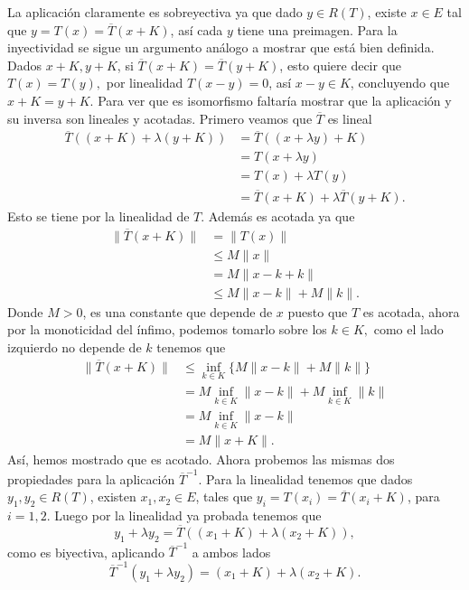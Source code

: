 \begin{itemize}
\begin{sproof}
        La aplicación claramente es sobreyectiva ya que dado $y\in R(T)$, existe $x\in E$ tal que $y=T(x)=\overline{T}(x+K)$, así cada $y$ tiene una preimagen. Para la inyectividad se sigue un argumento análogo a mostrar que está bien definida. Dados $x+K,y+K$, si $\overline{T}(x+K)=\overline{T}(y+K)$, esto quiere decir que $T(x)=T(y),$ por linealidad $T(x-y)=0$, así $x-y\in K$, concluyendo que $x+K=y+K.$ Para ver que es isomorfismo faltaría mostrar que la aplicación y su inversa son lineales y acotadas. Primero veamos que $\overline{T}$ es lineal
        \begin{align*}
              \overline{T}((x+K)+\lambda(y+K))&=\overline{T}((x+\lambda y)+K)\\
              &=T(x+\lambda y)\\
              &=T(x)+\lambda T(y)\\
              &=\overline{T}(x+K)+\lambda \overline{T}(y+K).
          \end{align*}  
          Esto se tiene por la linealidad de $T.$ Además es acotada ya que
          \begin{align*}
              \|\overline{T}(x+K)\|&=\|T(x)\|\\
              &\leq M\|x\|\\
              &=M\|x-k+k\|\\
              &\leq M\|x-k\|+M\|k\|.
          \end{align*}
          Donde $M>0$, es una constante que depende de $x$ puesto que $T$ es acotada, ahora por la monoticidad del ínfimo, podemos tomarlo sobre los $k\in K,$ como el lado izquierdo no depende de $k$ tenemos que
          \begin{align*}
              \|\overline{T}(x+K)\|&\leq\inf_{k\in K}\{M\|x-k\|+M\|k\|\}\\
              &= M\inf_{k\in K}\|x-k\|+M\inf_{k\in K}\|k\|\\
              &=M\inf_{k\in K}\|x-k\|\\
              &=M\|x+K\|.
          \end{align*}
          Así, hemos mostrado que es acotado. Ahora probemos las mismas dos propiedades para la aplicación $\overline{T}^{-1}.$ Para la linealidad tenemos que dados $y_1,y_2\in R(T)$, existen $x_1,x_2\in E$, tales que $y_i=T(x_i)=\overline{T}(x_i+K)$, para $i=1,2.$ Luego por la linealidad ya probada tenemos que $$y_1+\lambda y_2=\overline{T}((x_1+K)+\lambda(x_2+K)),$$ 
          como es biyectiva, aplicando $\overline{T}^{-1}$ a ambos lados
           $$\overline{T}^{-1}(y_1+\lambda y_2)=(x_1+K)+\lambda(x_2+K).$$


\end{sproof}
\end{itemize}

